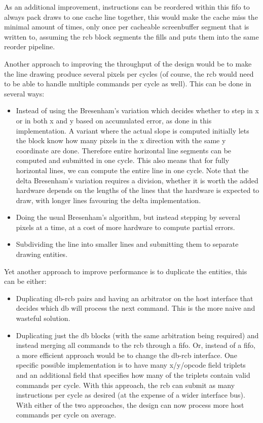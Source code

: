 \documentclass[]{article}
\begin{document}
As an additional improvement, instructions can be reordered within this fifo to always pack draws to one cache line together, this would make the cache miss the minimal amount of times, only once per cacheable screenbuffer segment that is written to, assuming the rcb block segments the fills and puts them into the same reorder pipeline.

Another approach to improving the throughput of the design would be to make the line drawing produce several pixels per cycles (of course, the rcb would need to be able to handle multiple commands per cycle as well). This can be done in several ways:
\begin{itemize}
	\item Instead of using the Bresenham's variation which decides whether to step in x or in both x and y based on accumulated error, as done in this implementation. A variant where the actual slope is computed initially lets the block know how many pixels in the x direction with the same y coordinate are done. Therefore entire horizontal line segments can be computed and submitted in one cycle. This also means that for fully horizontal lines, we can compute the entire line in one cycle. Note that the delta Bresenham's variation requires a division, whether it is worth the added hardware depends on the lengths of the lines that the hardware is expected to draw, with longer lines favouring the delta implementation.
	\item Doing the usual Bresenham's algorithm, but instead stepping by several pixels at a time, at a cost of more hardware to compute partial errors.
	\item Subdividing the line into smaller lines and submitting them to separate drawing entities.
\end{itemize}

Yet another approach to improve performance is to duplicate the entities, this can be either:
\begin{itemize}
	\item Duplicating db-rcb pairs and having an arbitrator on the host interface that decides which db will process the next command. This is the more naive and wasteful solution.
	\item Duplicating just the db blocks (with the same arbitration being required) and instead merging all commands to the rcb through a fifo. Or, instead of a fifo, a more efficient approach would be to change the db-rcb interface. One specific possible implementation is to have many x/y/opcode field triplets and an additional field that specifies how many of the triplets contain valid commands per cycle. With this approach, the rcb can submit as many instructions per cycle as desired (at the expense of a wider interface bus).
With either of the two approaches, the design can now process more host commands per cycle on average.
\end{itemize}
\end{document}
